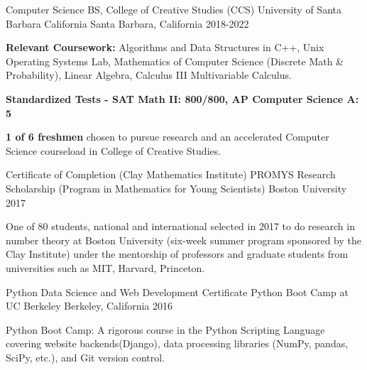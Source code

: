 
\begin{cventries}

  \cventry
  {Computer Science BS, College of Creative Studies (CCS)} %
    {University of Santa Barbara California} %
    {Santa Barbara, California} %
    {2018-2022} %
    {
    \begin{cvitems}
    \item \textbf{Relevant Coursework:} Algorithms and Data Structures in C++, Unix Operating Systems Lab, Mathematics of Computer Science (Discrete Math \& Probability), Linear Algebra, Calculus III Multivariable Calculus.
    \item \textbf{Standardized Tests - SAT Math II: 800/800, AP Computer Science A: 5}
    \item \textbf{1 of 6 freshmen} chosen to pursue research and an accelerated Computer Science courseload in College of Creative Studies.
    \end{cvitems}
    }


    \cventry
    {Certificate of Completion (Clay Mathematics Institute)} %
    {PROMYS Research Scholarship (Program in Mathematics for Young Scientists)} %
    {Boston University} %
    {2017} %
    {
    \begin{cvitems}
    \item One of 80 students, national and international selected in 2017 to do research in number theory at Boston University (six-week summer program sponsored by the Clay Institute) under the mentorship of professors and graduate students from universities such as MIT, Harvard, Princeton.
    \end{cvitems}
    }


 \cventry
    {Python Data Science and Web Development Certificate} %
    {Python Boot Camp at UC Berkeley} %
    {Berkeley, California} %
    {2016} %
    {
      \begin{cvitems}
      \item Python Boot Camp: A rigorous course in the Python Scripting Language covering website backends(Django), data processing libraries (NumPy, pandas, SciPy, etc.), and Git version control.
      \end{cvitems}
      }


\end{cventries}
